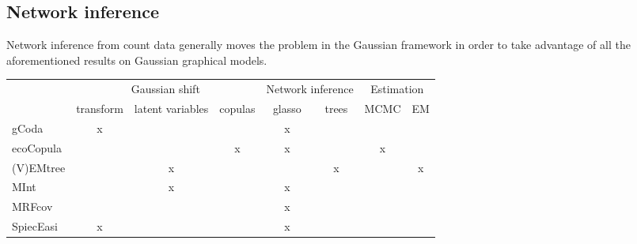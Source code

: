  \subsection{Network inference}
 Network inference from count data generally moves the problem in the Gaussian framework  in order to  take advantage of all the aforementioned results on Gaussian graphical models. \\
 
 
\begin{table}[H]
\begin{tabular}{l|ccc|cc|cc|}
\cline{2-8}
 & \multicolumn{3}{c|}{ Gaussian shift} & \multicolumn{2}{c|}{Network inference} & \multicolumn{2}{c|}{Estimation} \\ \cline{2-8} 
 & transform & latent variables & copulas & glasso & trees & MCMC & EM \\ \hline
\multicolumn{1}{|l|}{gCoda} & x &  &  & x &  &  &  \\ \hline
\multicolumn{1}{|l|}{ecoCopula} &  &  & x & x &  & x &  \\ \hline
\multicolumn{1}{|l|}{(V)EMtree} &  & x &  &  & x &  & x \\ \hline
\multicolumn{1}{|l|}{MInt} &  & x &  & x &  &  &  \\ \hline
\multicolumn{1}{|l|}{MRFcov} &  &  &  & x &  &  &  \\ \hline
\multicolumn{1}{|l|}{SpiecEasi} & x &  &  & x &  &  &  \\ \hline
\end{tabular}
\end{table}

  